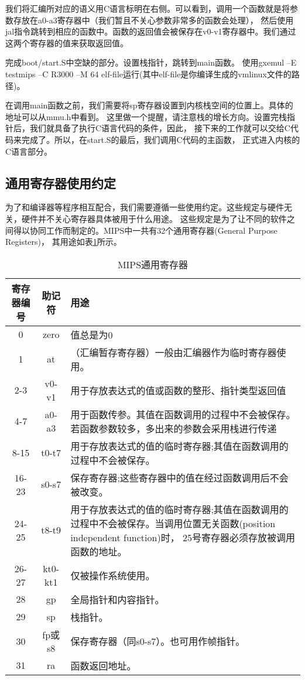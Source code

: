 我们将汇编所对应的语义用C语言标明在右侧。可以看到，调用一个函数就是将参数存放在a0-a3寄存器中（我们暂且不关心参数非常多的函数会处理），
然后使用jal指令跳转到相应的函数中。函数的返回值会被保存在v0-v1寄存器中。我们通过这两个寄存器的值来获取返回值。

\begin{exercise}
完成boot/start.S中空缺的部分。设置栈指针，跳转到main函数。
使用gxemul –E testmips –C R3000 –M 64 elf-file运行(其中elf-file是你编译生成的vmlinux文件的路径)。 
\end{exercise}

在调用main函数之前，我们需要将sp寄存器设置到内核栈空间的位置上。具体的地址可以从mmu.h中看到。
这里做一个提醒，请注意栈的增长方向。设置完栈指针后，我们就具备了执行C语言代码的条件，因此，
接下来的工作就可以交给C代码来完成了。所以，在start.S的最后，我们调用C代码的主函数，
正式进入内核的C语言部分。

\subsection{通用寄存器使用约定}
为了和编译器等程序相互配合，我们需要遵循一些使用约定。这些规定与硬件无关，硬件并不关心寄存器具体被用于什么用途。
这些规定是为了让不同的软件之间得以协同工作而制定的。MIPS中一共有32个通用寄存器(General Purpose Registers)，
其用途如表\ref{tab:registers}所示。

\begin{table}[h]
  \centering
  \begin{tabular}{ccp{10cm}}
    \toprule
    寄存器编号 & 助记符 & 用途 \\
    \midrule
    0   & zero & 值总是为0\\
    1   & at   & （汇编暂存寄存器）一般由汇编器作为临时寄存器使用。\\
    2-3 & v0-v1& 用于存放表达式的值或函数的整形、指针类型返回值\\
    4-7 & a0-a3& 用于函数传参。其值在函数调用的过程中不会被保存。若函数参数较多，多出来的参数会采用栈进行传递\\
    8-15& t0-t7& 用于存放表达式的值的临时寄存器;其值在函数调用的过程中不会被保存。\\
    16-23&s0-s7& 保存寄存器;这些寄存器中的值在经过函数调用后不会被改变。\\
    24-25&t8-t9& 用于存放表达式的值的临时寄存器;其值在函数调用的过程中不会被保存。当调用位置无关函数(position independent function)时，
               25号寄存器必须存放被调用函数的地址。\\
    26-27&kt0-kt1& 仅被操作系统使用。\\
    28  & gp   & 全局指针和内容指针。\\
    29  & sp   & 栈指针。\\
    30  &fp或s8& 保存寄存器（同s0-s7）。也可用作帧指针。\\
    31  & ra   & 函数返回地址。\\
    \bottomrule
  \end{tabular}
  \caption{MIPS通用寄存器\label{tab:registers}}
\end{table}

